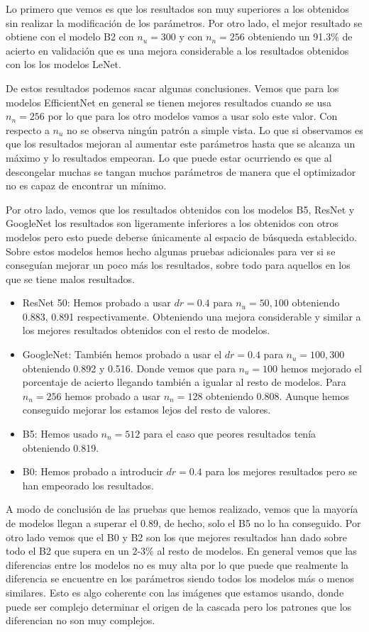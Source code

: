 \documentclass[a4paper,12pt,twoside,titlepage]{article}
\begin{document}
Lo primero que vemos es que los resultados son muy superiores a los obtenidos sin realizar la modificación de los parámetros. Por otro lado, el mejor resultado se obtiene con el modelo B2 con $n_u = 300$ y con $n_n = 256$ obteniendo un 91.3\% de acierto en validación que es una mejora considerable a los resultados obtenidos con los los modelos LeNet.

De estos resultados podemos sacar algunas conclusiones. Vemos que para los modelos EfficientNet en general se tienen mejores resultados cuando se usa $n_n = 256$ por lo que para los otro modelos vamos a usar solo este valor. Con respecto a $n_u$ no se observa ningún patrón a simple vista. Lo que si observamos es que los resultados mejoran al aumentar este parámetros hasta que se alcanza un máximo y lo resultados empeoran. Lo que puede estar ocurriendo es que al descongelar muchas se tangan muchos parámetros de manera que el optimizador no es capaz de encontrar un mínimo. 

Por otro lado, vemos que los resultados obtenidos con los modelos B5, ResNet y GoogleNet los resultados son ligeramente inferiores a los obtenidos con otros modelos pero esto puede deberse únicamente al espacio de búsqueda establecido. Sobre estos modelos hemos hecho algunas pruebas adicionales para ver si se conseguían mejorar un poco más los resultados, sobre todo para aquellos en los que se tiene malos resultados.

\begin{itemize}
  \item ResNet 50: Hemos probado a usar $dr = 0.4$ para $n_u = 50, 100$ obteniendo 0.883, 0.891 respectivamente. Obteniendo una mejora considerable y similar a los mejores resultados obtenidos con el resto de modelos.
  \item GoogleNet: También hemos probado a usar el $dr = 0.4$ para $n_u = 100, 300$ obteniendo 0.892 y 0.516. Donde vemos que para $n_u = 100$ hemos mejorado el porcentaje de acierto llegando también a igualar al resto de modelos. Para $n_n=256$ hemos probado a usar $n_n = 128$ obteniendo 0.808. Aunque hemos conseguido mejorar los estamos lejos del resto de valores.
  \item B5: Hemos usado $n_n = 512$ para el caso que peores resultados tenía obteniendo 0.819.
  \item B0: Hemos probado a introducir $dr = 0.4$ para los mejores resultados pero se han empeorado los resultados.
\end{itemize}

A modo de conclusión de las pruebas que hemos realizado, vemos que la mayoría de  modelos llegan a superar el 0.89, de hecho, solo el B5 no lo ha conseguido. Por otro lado vemos que el B0 y B2 son los que mejores resultados han dado sobre todo el B2 que supera en un 2-3\% al resto de modelos. En general vemos que las diferencias entre los modelos no es muy alta por lo que puede que realmente la diferencia se encuentre en los parámetros siendo todos los modelos más o menos similares. Esto es algo coherente con las imágenes que estamos usando, donde puede ser complejo determinar el origen de la cascada pero los patrones que los diferencian no son muy complejos.
\end{document}
